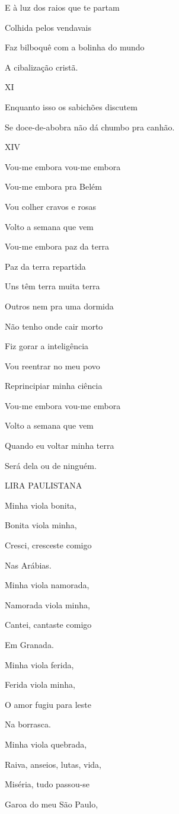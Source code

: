 E à luz dos raios que te partam

Colhida pelos vendavais

Faz bilboquê com a bolinha do mundo

A cibalização cristã.

XI

Enquanto isso os sabichões discutem

Se doce-de-abobra não dá chumbo pra canhão.

XIV

Vou-me embora vou-me embora

Vou-me embora pra Belém

Vou colher cravos e rosas

Volto a semana que vem

Vou-me embora paz da terra

Paz da terra repartida

Uns têm terra muita terra

Outros nem pra uma dormida

Não tenho onde cair morto

Fiz gorar a inteligência

Vou reentrar no meu povo

Reprincipiar minha ciência

Vou-me embora vou-me embora

Volto a semana que vem

Quando eu voltar minha terra

Será dela ou de ninguém.

\textsc{LIRA PAULISTANA}

Minha viola bonita,

Bonita viola minha,

Cresci, cresceste comigo

Nas Arábias.

Minha viola namorada,

Namorada viola minha,

Cantei, cantaste comigo

Em Granada.

Minha viola ferida,

Ferida viola minha,

O amor fugiu para leste

Na borrasca.

Minha viola quebrada,

Raiva, anseios, lutas, vida,

Miséria, tudo passou-se

Garoa do meu São Paulo,

